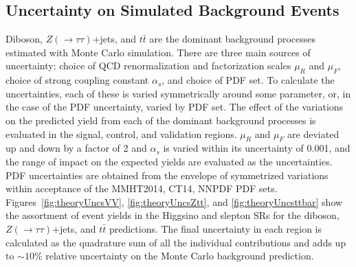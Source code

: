 \subsection{Uncertainty on Simulated Background Events}
Diboson, $Z(\rightarrow\tau\tau)$+jets, and $t\bar{t}$ are the dominant background processes estimated with Monte Carlo simulation.  There are three main sources of uncertainty: choice of QCD renormalization and factorization scales $\mu_R$ and $\mu_F$, choice of strong coupling constant $\alpha_s$, and choice of PDF set.  To calculate the uncertainties, each of these is varied symmetrically around some parameter, or, in the case of the PDF uncertainty, varied by PDF set.  The effect of the variations on the predicted yield from each of the dominant background processes is evaluated in the signal, control, and validation regions. $\mu_R$ and $\mu_F$ are deviated up and down by a factor of 2 and $\alpha_s$ is varied within its uncertainty of 0.001, and the range of impact on the expected yields are evaluated as the uncertainties.  PDF uncertainties are obtained from the envelope of symmetrized variations within acceptance of the MMHT2014, CT14, NNPDF PDF sets.  Figures~\ref{fig:theoryUncsVV}, \ref{fig:theoryUncsZtt}, and \ref{fig:theoryUncsttbar} show the assortment of event yields in the Higgsino and slepton SRs for the diboson, $Z(\rightarrow\tau\tau)$+jets, and $t\bar{t}$ predictions.  The final uncertainty in each region is calculated as the quadrature sum of all the individual contributions and adds up to $\sim10\%$ relative uncertainty on the Monte Carlo background prediction.


